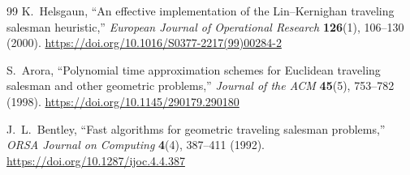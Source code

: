 \documentclass[11pt,a4paper]{article}
\begin{document}
\begin{thebibliography}{99}
K.~Helsgaun, ``An effective implementation of the Lin--Kernighan
traveling salesman heuristic,''
\emph{European Journal of Operational Research} \textbf{126}(1),
106--130 (2000).
\url{https://doi.org/10.1016/S0377-2217(99)00284-2}

S.~Arora, ``Polynomial time approximation schemes for Euclidean
traveling salesman and other geometric problems,''
\emph{Journal of the ACM} \textbf{45}(5), 753--782 (1998).
\url{https://doi.org/10.1145/290179.290180}

J.~L.~Bentley, ``Fast algorithms for geometric traveling salesman
problems,''
\emph{ORSA Journal on Computing} \textbf{4}(4), 387--411 (1992).
\url{https://doi.org/10.1287/ijoc.4.4.387}

\end{thebibliography}
\end{document}
